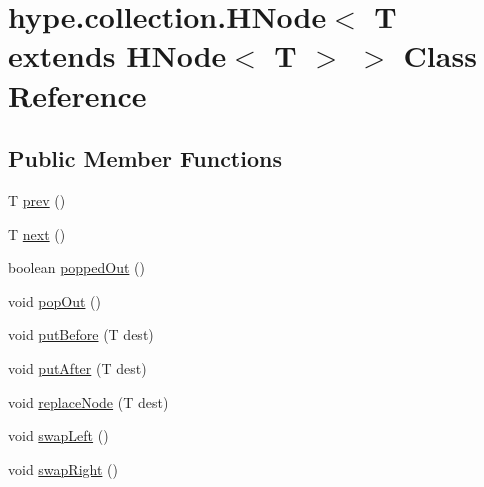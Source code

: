 \hypertarget{classhype_1_1collection_1_1_h_node_3_01_t_01extends_01_h_node_3_01_t_01_4_01_4}{\section{hype.\-collection.\-H\-Node$<$ T extends H\-Node$<$ T $>$ $>$ Class Reference}
\label{classhype_1_1collection_1_1_h_node_3_01_t_01extends_01_h_node_3_01_t_01_4_01_4}
}
\subsection*{Public Member Functions}
\begin{DoxyCompactItemize}
\item 
T \hyperlink{classhype_1_1collection_1_1_h_node_3_01_t_01extends_01_h_node_3_01_t_01_4_01_4_aae8ccc3adcc37e8a76c3cc9c8c547704}{prev} ()
\item 
T \hyperlink{classhype_1_1collection_1_1_h_node_3_01_t_01extends_01_h_node_3_01_t_01_4_01_4_a41263a2eb30234e80b1cc6bcc55a2b04}{next} ()
\item 
boolean \hyperlink{classhype_1_1collection_1_1_h_node_3_01_t_01extends_01_h_node_3_01_t_01_4_01_4_a330b060302135fb8f26dbb6fd78a13c0}{popped\-Out} ()
\item 
void \hyperlink{classhype_1_1collection_1_1_h_node_3_01_t_01extends_01_h_node_3_01_t_01_4_01_4_a3165490a430113a73ed823954d1dd25d}{pop\-Out} ()
\item 
void \hyperlink{classhype_1_1collection_1_1_h_node_3_01_t_01extends_01_h_node_3_01_t_01_4_01_4_ac9220d1f8393686b5104df6f4da8e4be}{put\-Before} (T dest)
\item 
void \hyperlink{classhype_1_1collection_1_1_h_node_3_01_t_01extends_01_h_node_3_01_t_01_4_01_4_a08c0acc59fa09953be41220884d6f5a2}{put\-After} (T dest)
\item 
void \hyperlink{classhype_1_1collection_1_1_h_node_3_01_t_01extends_01_h_node_3_01_t_01_4_01_4_a187049986a5f455ed4d5fa03b85847dc}{replace\-Node} (T dest)
\item 
void \hyperlink{classhype_1_1collection_1_1_h_node_3_01_t_01extends_01_h_node_3_01_t_01_4_01_4_a5dfe63c251a2704908e6bb78f7ed9189}{swap\-Left} ()
\item 
void \hyperlink{classhype_1_1collection_1_1_h_node_3_01_t_01extends_01_h_node_3_01_t_01_4_01_4_a0e50c91ed5b7f2d4b25544738b616b74}{swap\-Right} ()
\end{DoxyCompactItemize}
